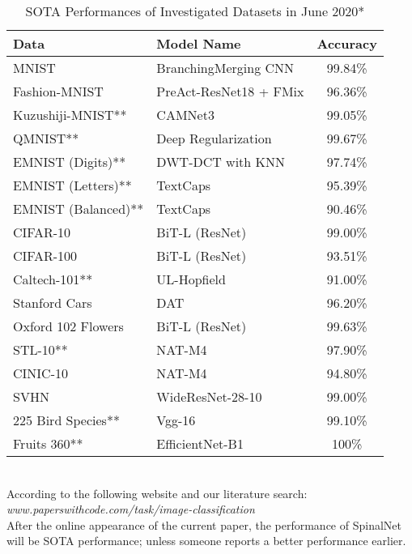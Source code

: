 \documentclass[journal]{IEEEtran}
\begin{document}
\begin{table}
\centering
\caption{SOTA Performances of Investigated Datasets in June 2020*}
\label{SOTA_TAB}
\begin{tabular}{|l|l|c|}
\hline
 Data&Model Name  & Accuracy    \\ \hline 
 MNIST&BranchingMerging CNN  \cite{byerly2020branching} & 99.84\%   \\ \hline 
 
 Fashion-MNIST&PreAct-ResNet18 + FMix  \cite{harris2020understanding} & 96.36\%   \\ \hline 
 Kuzushiji-MNIST**&	CAMNet3 \cite{tissera2019context}   & 99.05\%    \\ \hline 
 QMNIST**&Deep Regularization  \cite{yoo2020deep} & 99.67\%    \\ \hline 
 EMNIST (Digits)** & DWT-DCT with KNN  \cite{ghadekar2018handwritten} & 97.74\%    \\ \hline 
 EMNIST (Letters)**& TextCaps  \cite{jayasundara2019textcaps} & 95.39\%    \\ \hline 
 EMNIST (Balanced)**& TextCaps  \cite{jayasundara2019textcaps} & 90.46\%    \\ \hline 
 CIFAR-10& 	BiT-L (ResNet) \cite{kolesnikov2019large}  & 99.00\%  \\ \hline 
  CIFAR-100& BiT-L (ResNet) \cite{kolesnikov2019large} & 93.51\%  \\ \hline 
  Caltech-101**& UL-Hopfield \cite{liu2018unsupervised} & 91.00\%  \\ \hline 
  Stanford Cars& DAT \cite{Ngiam2018unsupervised} & 96.20\%  \\ \hline 
  Oxford 102 Flowers& BiT-L (ResNet) \cite{kolesnikov2019large} & 99.63\%  \\ \hline
  STL-10** & NAT-M4 \cite{lu2020neural} & 97.90\% \\ \hline
  CINIC-10 & NAT-M4 \cite{lu2020neural} & 94.80\% \\ \hline
  SVHN & WideResNet-28-10 \cite{Cubuk2019randaugment}  & 99.00\% \\ \hline
  225 Bird Species** & Vgg-16 \cite{bird_vgg16} & 99.10\% \\ \hline
  Fruits 360** & EfficientNet-B1  \cite{duong2020automated} & 100\% \\ \hline
\end{tabular}
\\  According to the following website and our literature search:  \emph{www.paperswithcode.com/task/image-classification}  \\  
 After the online appearance of the current paper, the performance of SpinalNet will be SOTA performance; unless someone reports a better performance earlier.

\end{table}
\end{document}
